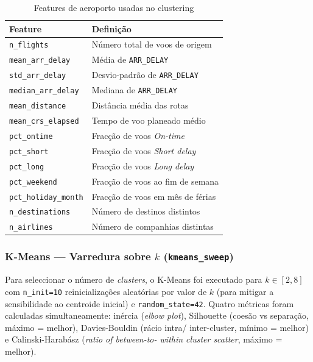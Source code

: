 \documentclass[conference]{IEEEtran}
\begin{document}
\begin{table}[h]
\centering
\caption{Features de aeroporto usadas no clustering}
\label{tab:cluster_features}
\setlength{\tabcolsep}{3pt}
\begin{tabular}{p{2.8cm}p{4.4cm}}
\toprule
\textbf{Feature} & \textbf{Definição} \\
\midrule
\texttt{n\_flights} & Número total de voos de origem \\
\texttt{mean\_arr\_delay} & Média de \texttt{ARR\_DELAY} \\
\texttt{std\_arr\_delay} & Desvio-padrão de \texttt{ARR\_DELAY} \\
\texttt{median\_arr\_delay} & Mediana de \texttt{ARR\_DELAY} \\
\texttt{mean\_distance} & Distância média das rotas \\
\texttt{mean\_crs\_elapsed} & Tempo de voo planeado médio \\
\texttt{pct\_ontime} & Fracção de voos \textit{On-time} \\
\texttt{pct\_short} & Fracção de voos \textit{Short delay} \\
\texttt{pct\_long} & Fracção de voos \textit{Long delay} \\
\texttt{pct\_weekend} & Fracção de voos ao fim de semana \\
\texttt{pct\_holiday\_month} & Fracção de voos em mês de férias \\
\texttt{n\_destinations} & Número de destinos distintos \\
\texttt{n\_airlines} & Número de companhias distintas \\
\bottomrule
\end{tabular}
\end{table}

\subsubsection{K-Means — Varredura sobre $k$ (\texttt{kmeans\_sweep})}
Para seleccionar o número de \textit{clusters}, o K-Means foi executado para
$k \in [2, 8]$ com \texttt{n\_init=10} reinicializações aleatórias por valor de
$k$ (para mitigar a sensibilidade ao centroide inicial) e \texttt{random\_state=42}.
Quatro métricas foram calculadas simultaneamente: inércia (\textit{elbow plot}),
Silhouette (coesão vs separação, máximo = melhor), Davies-Bouldin (rácio intra/
inter-cluster, mínimo = melhor) e Calinski-Harabász (\textit{ratio of between-to-
within cluster scatter}, máximo = melhor).
\end{document}
